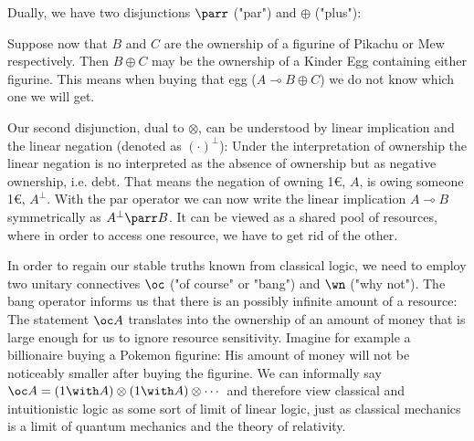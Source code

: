 \documentclass[DIN, pagenumber=false, fontsize=11pt, parskip=half, colorinlistoftodos, svgnames]{scrartcl}
\begin{document}
	Dually, we have two disjunctions $\parr$ ("par") and $\oplus$ ("plus"):
	
	Suppose now that $B$ and $C$ are the ownership of a figurine of Pikachu or Mew respectively. 
	Then $B \oplus C$ may be the ownership of a Kinder Egg containing either figurine. 
	This means when buying that egg ($A \multimap B \oplus C$) we do not know which one we will get. 
	
	Our second disjunction, dual to $\otimes$, can be understood by linear implication and the linear negation (denoted as $(\cdot)^\bot$): 
	Under the interpretation of ownership the linear negation is no interpreted as the absence of ownership but as negative ownership, i.e. debt. 
	That means the negation of owning 1\euro, $A$, is owing someone 1\euro, $A^\bot$. 
	With the par operator we can now write the linear implication $A \multimap B$ symmetrically as $A^\bot \parr B$. 
	It can be viewed as a shared pool of resources, where in order to access one resource, we have to get rid of the other.
	
	In order to regain our stable truths known from classical logic, we need to employ two unitary connectives $\oc$ ("of course" or "bang") and $\wn$ ("why not"). 
	The bang operator informs us that there is an possibly infinite amount of a resource: 
	The statement $\oc A$ translates into the ownership of an amount of money that is large enough for us to ignore resource sensitivity. 
	Imagine for example a billionaire buying a Pokemon figurine: His amount of money will not be noticeably smaller after buying the figurine. We can informally say $\oc A = (1 \with A) \otimes (1 \with A) \otimes \cdots $ and therefore view classical and intuitionistic logic as some sort of limit of linear logic, just as classical mechanics is a limit of quantum mechanics and the theory of relativity. 
	
	
\end{document}
